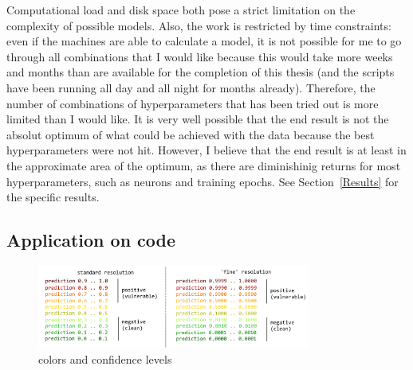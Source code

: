 \documentclass[
a4paper,
pagesize,
pdftex,
12pt,
twoside, %
BCOR=5mm, %
ngerman,
fleqn,
final,
]{scrartcl}
\begin{document}
	Computational load and disk space both pose a strict limitation on the complexity of possible models. Also, the work is restricted by time constraints: even if the machines are able to calculate a model, it is not possible for me to go through all combinations that I would like because this would take more weeks and months than are available for the completion of this thesis (and the scripts have been running all day and all night for months already). Therefore, the number of combinations of hyperparameters that has been tried out is more limited than I would like. It is very well possible that the end result is not the absolut optimum of what could be achieved with the data because the best hyperparameters were not hit. However, I believe that the end result is at least in the approximate area of the optimum, as there are diminishinig returns for most hyperparameters, such as neurons and training epochs. See Section~\ref{Results} for the specific results. 
		
	\subsection{Application on code}
	\begin{figure}[h]
		\centering
		\includegraphics[width=0.8\textwidth]{img/colorkey.png}
		\caption{colors and confidence levels}
		\label{fig:colors}
	\end{figure}
	
\end{document}
